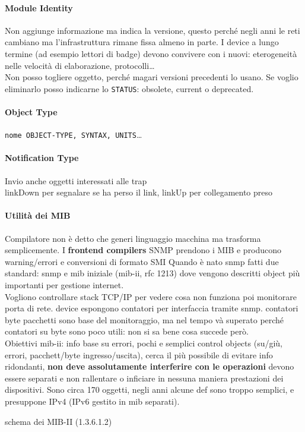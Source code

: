 \documentclass[10pt]{book}
\begin{document}
\paragraph{Module Identity} Non aggiunge informazione ma indica la versione, questo perché negli anni le reti cambiano ma l'infrastruttura rimane fissa almeno in parte. I device a lungo termine (ad esempio lettori di badge) devono convivere con i nuovi: eterogeneità nelle velocità di elaborazione, protocolli\ldots\\
Non posso togliere oggetto, perché magari versioni precedenti lo usano. Se voglio eliminarlo posso indicarne lo \texttt{STATUS}: obsolete, current o deprecated.
\paragraph{Object Type} \texttt{nome OBJECT-TYPE, SYNTAX, UNITS}\ldots
\paragraph{Notification Type} Invio anche oggetti interessati alle trap\\
linkDown per segnalare se ha perso il link, linkUp per collegamento preso
\paragraph{Utilità dei MIB} Compilatore non è detto che generi linguaggio macchina ma trasforma semplicemente. I \textbf{frontend compilers} SNMP prendono i MIB e producono warning/errori e conversioni di formato SMI
Quando è nato snmp fatti due standard: snmp e mib iniziale (mib-ii, rfc 1213) dove vengono descritti object più importanti per gestione internet.\\
Vogliono controllare stack TCP/IP per vedere cosa non funziona poi monitorare porta di rete. device espongono contatori per interfaccia tramite snmp. contatori byte pacchetti sono base del monitoraggio, ma nel tempo và superato perché contatori su byte sono poco utili: non si sa bene cosa succede però. \\
Obiettivi mib-ii: info base su errori, pochi e semplici control objects (su/giù, errori, pacchett/byte ingresso/uscita), cerca il più possibile di evitare info ridondanti, \textbf{non deve assolutamente interferire con le operazioni} devono essere separati e non rallentare o inficiare in nessuna maniera prestazioni dei dispositivi. Sono circa 170 oggetti, negli anni alcune def sono troppo semplici, e presuppone IPv4 (IPv6 gestito in mib separati).\\
\begin{center}
	schema dei MIB-II (1.3.6.1.2)
\end{center}
\end{document}
